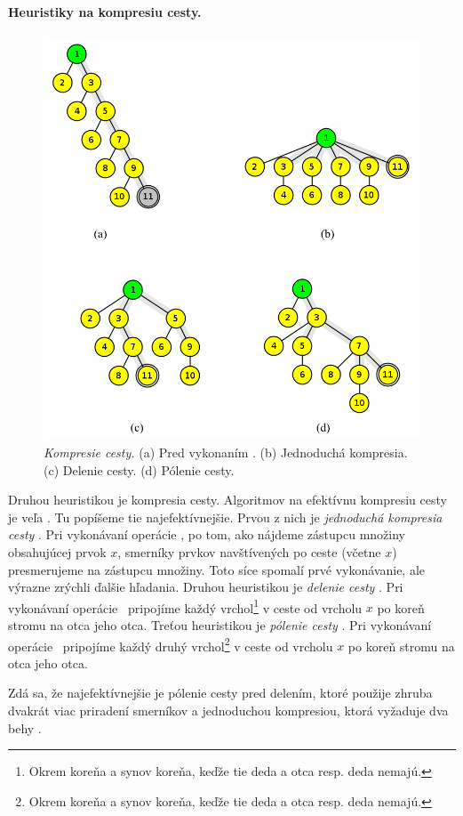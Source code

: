 \paragraph{Heuristiky na kompresiu cesty.}

\begin{figure}
\includegraphics[width=\columnwidth]{obrazky/komp.png}
\caption{\emph{Kompresie cesty.} (a) Pred vykonaním \find. (b) Jednoduchá 
kompresia. (c) Delenie cesty. (d) Pólenie cesty.} 
\label{img:komp} 
\end{figure}

Druhou heuristikou je kompresia cesty. Algoritmov na efektívnu kompresiu 
cesty je veľa \citep{paths2}. Tu popíšeme tie najefektívnejšie. Prvou z nich 
je \emph{jednoduchá kompresia cesty} \citep{comp1}. Pri vykonávaní 
operácie \find, po tom, 
ako nájdeme zástupcu množiny obsahujúcej prvok $x$, smerníky prvkov 
navštívených po ceste (včetne $x$) presmerujeme na zástupcu množiny. Toto 
síce spomalí prvé vykonávanie, ale výrazne zrýchli ďalšie hľadania. 
Druhou heuristikou je \emph{delenie cesty} \citep{comp2}. Pri vykonávaní 
operácie \find\ 
pripojíme každý vrchol\footnote{Okrem koreňa a synov koreňa, 
keďže tie deda a otca resp. deda nemajú.} v ceste od vrcholu $x$ po koreň stromu 
na otca jeho otca. 
Treťou heuristikou je \emph{pólenie cesty} \citep{comp2}. Pri vykonávaní 
operácie \find\ 
pripojíme každý druhý vrchol\footnote{Okrem koreňa a synov koreňa, 
keďže tie deda a otca resp. deda nemajú.} 
v ceste od vrcholu $x$ po koreň stromu na otca jeho otca. 

Zdá sa, že najefektívnejšie je pólenie cesty pred delením, ktoré 
použije zhruba dvakrát viac priradení smerníkov a jednoduchou kompresiou, 
ktorá vyžaduje dva behy \citep{galil}. 


